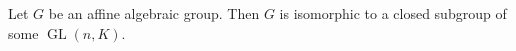 Let $G$ be an affine algebraic group. Then $G$ is isomorphic to a closed subgroup of some $\operatorname{GL}(n, K)$.
